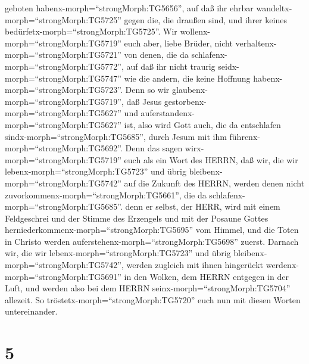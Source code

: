 geboten habenx-morph=``strongMorph:TG5656'',  auf daß ihr
ehrbar wandeltx-morph=``strongMorph:TG5725'' gegen die, die draußen
sind, und ihrer keines bedürfetx-morph=``strongMorph:TG5725''.
 Wir wollenx-morph=``strongMorph:TG5719'' euch aber, liebe
Brüder, nicht verhaltenx-morph=``strongMorph:TG5721'' von denen, die da
schlafenx-morph=``strongMorph:TG5772'', auf daß ihr nicht traurig
seidx-morph=``strongMorph:TG5747'' wie die andern, die keine Hoffnung
habenx-morph=``strongMorph:TG5723''.  Denn so wir
glaubenx-morph=``strongMorph:TG5719'', daß Jesus
gestorbenx-morph=``strongMorph:TG5627'' und
auferstandenx-morph=``strongMorph:TG5627'' ist, also wird Gott auch, die
da entschlafen sindx-morph=``strongMorph:TG5685'', durch Jesum mit ihm
führenx-morph=``strongMorph:TG5692''.  Denn das sagen
wirx-morph=``strongMorph:TG5719'' euch als ein Wort des HERRN, daß wir,
die wir lebenx-morph=``strongMorph:TG5723'' und übrig
bleibenx-morph=``strongMorph:TG5742'' auf die Zukunft des HERRN, werden
denen nicht zuvorkommenx-morph=``strongMorph:TG5661'', die da
schlafenx-morph=``strongMorph:TG5685''.  denn er selbst,
der HERR, wird mit einem Feldgeschrei und der Stimme des Erzengels und
mit der Posaune Gottes herniederkommenx-morph=``strongMorph:TG5695'' vom
Himmel, und die Toten in Christo werden
auferstehenx-morph=``strongMorph:TG5698'' zuerst.  Darnach
wir, die wir lebenx-morph=``strongMorph:TG5723'' und übrig
bleibenx-morph=``strongMorph:TG5742'', werden zugleich mit ihnen
hingerückt werdenx-morph=``strongMorph:TG5691'' in den Wolken, dem HERRN
entgegen in der Luft, und werden also bei dem HERRN
seinx-morph=``strongMorph:TG5704'' allezeit.  So
tröstetx-morph=``strongMorph:TG5720'' euch nun mit diesen Worten
untereinander.

\hypertarget{section-4}{%
\section{5}\label{section-4}}

